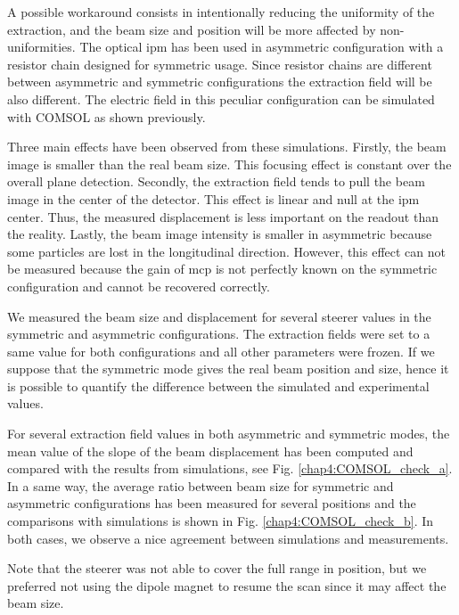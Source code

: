 \begin{refsection}
  A possible workaround consists in intentionally reducing the uniformity of the extraction, and the beam size and position will be more affected by non-uniformities. The optical \acrshort{ipm} has been used in asymmetric configuration with a resistor chain designed for symmetric usage. Since resistor chains are different between asymmetric and symmetric configurations the extraction field will be also different. The electric field in this peculiar configuration can be simulated with COMSOL as shown previously.

  Three main effects have been observed from these simulations. Firstly, the beam image is smaller than the real beam size. This focusing effect is constant over the overall plane detection. Secondly, the extraction field tends to pull the beam image in the center of the detector. This effect is linear and null at the \acrshort{ipm} center. Thus, the measured displacement is less important on the readout than the reality. Lastly, the beam image intensity is smaller in asymmetric because some particles are lost in the longitudinal direction. However, this effect can not be measured because the gain of \acrshort{mcp} is not perfectly known on the symmetric configuration and cannot be recovered correctly.

  We measured the beam size and displacement for several steerer values in the symmetric and asymmetric configurations.
  The extraction fields were set to a same value for both configurations and all other parameters were frozen. If we suppose that the symmetric mode gives the real beam position and size, hence it is possible to quantify the difference between the simulated and experimental values.

  For several extraction field values in both asymmetric and symmetric modes, the mean value of the slope of the beam displacement has been computed and compared with the results from simulations, see Fig. \ref{chap4:COMSOL_check_a}. In a same way, the average ratio between beam size for symmetric and asymmetric configurations has been measured for several positions and the comparisons with simulations is shown in Fig. \ref{chap4:COMSOL_check_b}. In both cases, we observe a nice agreement between simulations and measurements.

  

  Note that the steerer was not able to cover the full range in position, but we preferred not using the dipole magnet to resume the scan since it may affect the beam size.


\end{refsection}
